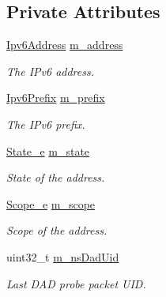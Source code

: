\subsection*{Private Attributes}
\begin{DoxyCompactItemize}
\item 
\hyperlink{classns3_1_1Ipv6Address}{Ipv6\+Address} \hyperlink{classns3_1_1Ipv6InterfaceAddress_a078329fc0d20d6e74b4d6e5d7295e680}{m\+\_\+address}
\begin{DoxyCompactList}\small\item\em The I\+Pv6 address. \end{DoxyCompactList}\item 
\hyperlink{classns3_1_1Ipv6Prefix}{Ipv6\+Prefix} \hyperlink{classns3_1_1Ipv6InterfaceAddress_ac0f3c2c541b81d15d029942c055dc0ed}{m\+\_\+prefix}
\begin{DoxyCompactList}\small\item\em The I\+Pv6 prefix. \end{DoxyCompactList}\item 
\hyperlink{classns3_1_1Ipv6InterfaceAddress_aa01e95b0e78bf3f0200a98f6bfe64f07}{State\+\_\+e} \hyperlink{classns3_1_1Ipv6InterfaceAddress_ab8143724ac3ae6eb71e3595e78b01b2f}{m\+\_\+state}
\begin{DoxyCompactList}\small\item\em State of the address. \end{DoxyCompactList}\item 
\hyperlink{classns3_1_1Ipv6InterfaceAddress_ad3f03debf9dae475b81ea9cdf81f4f27}{Scope\+\_\+e} \hyperlink{classns3_1_1Ipv6InterfaceAddress_ab54a5b874e1fd96b7ad176dc8bb90c89}{m\+\_\+scope}
\begin{DoxyCompactList}\small\item\em Scope of the address. \end{DoxyCompactList}\item 
uint32\+\_\+t \hyperlink{classns3_1_1Ipv6InterfaceAddress_a086053e4eccd290dc567dc78d9277736}{m\+\_\+ns\+Dad\+Uid}
\begin{DoxyCompactList}\small\item\em Last D\+AD probe packet U\+ID. \end{DoxyCompactList}\end{DoxyCompactItemize}
